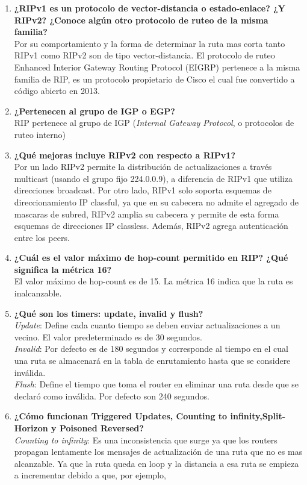 \documentclass[letterpaper,12pt]{article}
\begin{document}
	\begin{enumerate}
		\item \textbf{¿RIPv1 es un protocolo de vector-distancia o estado-enlace? ¿Y RIPv2? ¿Conoce algún otro protocolo de ruteo de la misma familia?} \\
		Por su comportamiento y la forma de determinar la ruta mas corta tanto RIPv1 como RIPv2 son de tipo vector-distancia. El protocolo de ruteo Enhanced Interior Gateway Routing Protocol (EIGRP) pertenece a la misma familia de RIP, es un protocolo propietario de Cisco el cual fue convertido a código abierto en 2013.
		\item \textbf{¿Pertenecen al grupo de IGP o EGP?}\\
		RIP pertenece al grupo de IGP (\textit{Internal Gateway Protocol}, o protocolos de ruteo interno)
		\item \textbf{¿Qué mejoras incluye RIPv2 con respecto a RIPv1?}\\
		Por un lado RIPv2 permite la distribución de actualizaciones a través multicast (usando el grupo fijo 224.0.0.9), a diferencia de RIPv1 que utiliza direcciones broadcast. Por otro lado, RIPv1 solo soporta esquemas de direccionamiento IP classful, ya que en su cabecera no admite el agregado de mascaras de subred, RIPv2 amplia su cabecera y permite de esta forma esquemas de direcciones IP classless. Además, RIPv2 agrega autenticación entre los peers.
		\item \textbf{¿Cuál es el valor máximo de hop-count permitido en RIP? ¿Qué significa la métrica 16?}\\
		El valor máximo de hop-count es de 15. La métrica 16 indica que la ruta es inalcanzable.
		\item \textbf{ ¿Qué son los timers: update, invalid y flush?}\\
		\textit{Update}: Define cada cuanto tiempo se deben enviar actualizaciones a un vecino. El valor predeterminado es de 30 segundos.\\
		\textit{Invalid}: Por defecto es de 180 segundos y corresponde al tiempo en el cual una ruta se almacenará en la tabla de enrutamiento hasta que se considere inválida.\\
		\textit{Flush}: Define el tiempo que toma el router en eliminar una ruta desde que se declaró como inválida. Por defecto son 240 segundos.
		\item \textbf{¿Cómo funcionan Triggered Updates, Counting to infinity,Split-Horizon y Poisoned Reversed?}\\
		\textit{Counting to infinity}: Es una inconsistencia que surge ya que los routers propagan lentamente los mensajes de actualización de una ruta que no es mas alcanzable.  Ya que la ruta queda en loop y la distancia a esa ruta se empieza a incrementar debido a que, por ejemplo,  

\end{enumerate}
\end{document}
